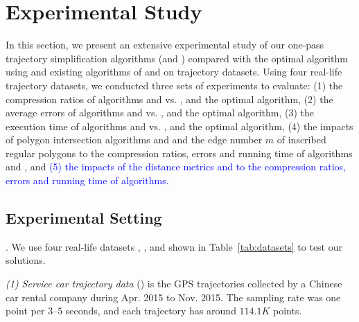 \section{Experimental Study} %
\label{sec-exp}


In this section, we present an extensive experimental study of our one-pass trajectory simplification algorithms (\cist and \cista) compared with the optimal algorithm using \sed and existing algorithms of \dps and \squishe on trajectory datasets.
Using four real-life trajectory datasets, we conducted three sets of experiments to evaluate:
(1) the compression ratios of algorithms \cist and \cista vs. \dps, \squishe and the optimal algorithm,
(2) the average errors of algorithms \cist and \cista vs. \dps, \squishe and the optimal algorithm,
(3) the execution time of algorithms \cist and \cista vs. \dps, \squishe and the optimal algorithm, 
(4) the impacts of polygon intersection algorithms \rpia and \cpia and the edge number $m$ of inscribed regular polygons to the compression ratios, errors and running time of algorithms \cist and \cista, and
\textcolor{blue}{(5) the impacts of the distance metrics \ped and \sed to the compression ratios, errors and running time of algorithms.}

\subsection{Experimental Setting}

.
We use four real-life datasets \sercar, \geolife, \mopsi and \pricar shown in Table~\ref{tab:datasets} to test our solutions.


\vspace{0.5ex}
\ni \emph{(1) Service car trajectory data} (\sercar) is the GPS trajectories collected by a Chinese car rental company during Apr. 2015 to Nov. 2015. The sampling rate was one point per $3$--$5$ seconds, and
each trajectory has around $114.1K$ points.

